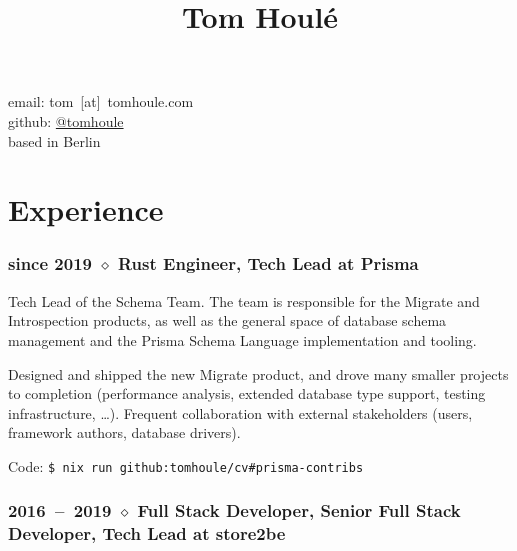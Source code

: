\documentclass[10pt]{article}
\date{}
\title{Tom Houlé}
\author{}
\newcommand{\setparskip}{\setlength{\parskip}{.3em}}
\begin{document}
\maketitle

\vspace{-14mm}

\begin{center}
email: tom~[at]~tomhoule.com \\
github: \href{https://github.com/tomhoule}{@tomhoule} \\
based in Berlin
\end{center}

\vspace{10mm}

\begin{minipage}[t]{0.54\textwidth}
  \setparskip

  \section*{Experience}

  \subsubsection*{since 2019 $\diamond$ Rust Engineer, Tech Lead at Prisma}

    \vspace{-0.8em}

    Tech Lead of the Schema Team. The team is responsible for the Migrate
    and Introspection products, as well as the general space of database schema
    management and the Prisma Schema Language implementation and tooling.

    Designed and shipped the new Migrate product, and drove many smaller projects to completion (performance analysis, extended database type support, testing infrastructure, …). Frequent collaboration with external stakeholders (users, framework authors, database drivers).

    Code: \texttt{\$ nix run github:tomhoule/cv\#prisma-contribs}

    \vspace{-0.5em}

    \subsubsection*{2016~--~2019 $\diamond$ Full Stack Developer, Senior Full Stack Developer, Tech Lead at store2be}

    \vspace{-0.8em}


\end{minipage}
\end{document}
